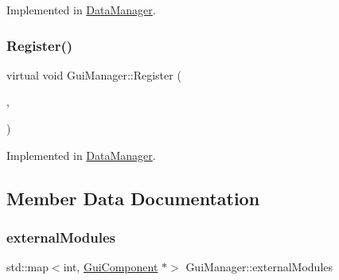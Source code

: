 Implemented in \mbox{\hyperlink{class_data_manager_a46cc380fc22a3069d3e55800b3f39d4f}{Data\+Manager}}.

\mbox{\label{class_gui_manager_acad986a245ce983ac46d0f1f38107c56}} 
\subsubsection{\texorpdfstring{Register()}{Register()}}
{\footnotesize\ttfamily virtual void Gui\+Manager\+::\+Register (\begin{DoxyParamCaption}\item[{\mbox{\hyperlink{_mediator_2_mediator_2_commons_8h_a88683b64d84542943724ba0f211153af}{Module}}}]{,  }\item[{\mbox{\hyperlink{class_gui_component}{Gui\+Component}} $\ast$}]{ }\end{DoxyParamCaption})\hspace{0.3cm}{\ttfamily [pure virtual]}}



Implemented in \mbox{\hyperlink{class_data_manager_a7be4a3267e02031eb2825fb7dd3dc4eb}{Data\+Manager}}.



\subsection{Member Data Documentation}
\mbox{\label{class_gui_manager_aff0931acdb10aefb4425e0ecd8061b43}} 
\subsubsection{\texorpdfstring{externalModules}{externalModules}}
{\footnotesize\ttfamily std\+::map$<$int, \mbox{\hyperlink{class_gui_component}{Gui\+Component}} $\ast$$>$ Gui\+Manager\+::external\+Modules\hspace{0.3cm}{\ttfamily [protected]}}

\mbox{\label{class_gui_manager_ad980176ae4a013e537866439a440ba6a}} 
